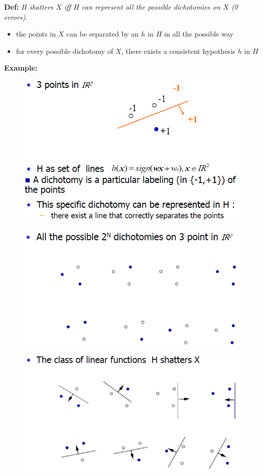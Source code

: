 \documentclass[../main.tex]{subfiles}
\begin{document}
\noindent \textbf{Def:} \emph{H shatters $X$ iff $H$ can represent all the possible dichotomies on $X$ (0 errors)}.
\begin{itemize}
    \item the points in $X$ can be separated by an $h$ in $H$ in all the possible way
    \item for every possible dichotomy of $X$, there exists a consistent hypothesis $h$ in $H$
\end{itemize}
\textbf{Example:}
\begin{figure}[H]
    \centering
    \includegraphics[scale = 0.5]{lectures/5_validation/5_dic_1.png}
\end{figure}
\begin{figure}[H]
    \centering
    \includegraphics[scale = 0.5]{lectures/5_validation/5_dic_2.png}
\end{figure}
\begin{figure}[H]
    \centering
    \includegraphics[scale = 0.5]{lectures/5_validation/5_dic_3.png}
\end{figure}
\end{document}
